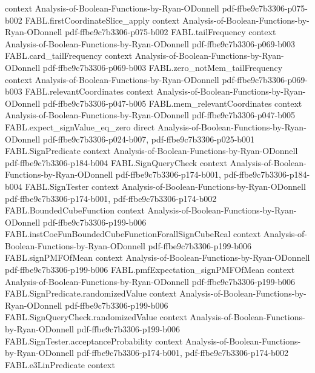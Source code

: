 \begin{theorem}
  {context}
  {Analysis-of-Boolean-Functions-by-Ryan-ODonnell}
  {pdf-ffbe9c7b3306-p075-b002}
\proofstep
  {FABL.firstCoordinateSlice_apply}
  {context}
  {Analysis-of-Boolean-Functions-by-Ryan-ODonnell}
  {pdf-ffbe9c7b3306-p075-b002}
\proofstep
  {FABL.tailFrequency}
  {context}
  {Analysis-of-Boolean-Functions-by-Ryan-ODonnell}
  {pdf-ffbe9c7b3306-p069-b003}
\proofstep
  {FABL.card_tailFrequency}
  {context}
  {Analysis-of-Boolean-Functions-by-Ryan-ODonnell}
  {pdf-ffbe9c7b3306-p069-b003}
\proofstep
  {FABL.zero_notMem_tailFrequency}
  {context}
  {Analysis-of-Boolean-Functions-by-Ryan-ODonnell}
  {pdf-ffbe9c7b3306-p069-b003}
\proofstep
  {FABL.relevantCoordinates}
  {context}
  {Analysis-of-Boolean-Functions-by-Ryan-ODonnell}
  {pdf-ffbe9c7b3306-p047-b005}
\proofstep
  {FABL.mem_relevantCoordinates}
  {context}
  {Analysis-of-Boolean-Functions-by-Ryan-ODonnell}
  {pdf-ffbe9c7b3306-p047-b005}
\proofstep
  {FABL.expect_signValue_eq_zero}
  {direct}
  {Analysis-of-Boolean-Functions-by-Ryan-ODonnell}
  {pdf-ffbe9c7b3306-p024-b007,
    pdf-ffbe9c7b3306-p025-b001}
\proofstep
  {FABL.SignPredicate}
  {context}
  {Analysis-of-Boolean-Functions-by-Ryan-ODonnell}
  {pdf-ffbe9c7b3306-p184-b004}
\proofstep
  {FABL.SignQueryCheck}
  {context}
  {Analysis-of-Boolean-Functions-by-Ryan-ODonnell}
  {pdf-ffbe9c7b3306-p174-b001,
    pdf-ffbe9c7b3306-p184-b004}
\proofstep
  {FABL.SignTester}
  {context}
  {Analysis-of-Boolean-Functions-by-Ryan-ODonnell}
  {pdf-ffbe9c7b3306-p174-b001,
    pdf-ffbe9c7b3306-p174-b002}
\proofstep
  {FABL.BoundedCubeFunction}
  {context}
  {Analysis-of-Boolean-Functions-by-Ryan-ODonnell}
  {pdf-ffbe9c7b3306-p199-b006}
\proofstep
  {FABL.instCoeFunBoundedCubeFunctionForallSignCubeReal}
  {context}
  {Analysis-of-Boolean-Functions-by-Ryan-ODonnell}
  {pdf-ffbe9c7b3306-p199-b006}
\proofstep
  {FABL.signPMFOfMean}
  {context}
  {Analysis-of-Boolean-Functions-by-Ryan-ODonnell}
  {pdf-ffbe9c7b3306-p199-b006}
\proofstep
  {FABL.pmfExpectation_signPMFOfMean}
  {context}
  {Analysis-of-Boolean-Functions-by-Ryan-ODonnell}
  {pdf-ffbe9c7b3306-p199-b006}
\proofstep
  {FABL.SignPredicate.randomizedValue}
  {context}
  {Analysis-of-Boolean-Functions-by-Ryan-ODonnell}
  {pdf-ffbe9c7b3306-p199-b006}
\proofstep
  {FABL.SignQueryCheck.randomizedValue}
  {context}
  {Analysis-of-Boolean-Functions-by-Ryan-ODonnell}
  {pdf-ffbe9c7b3306-p199-b006}
\proofstep
  {FABL.SignTester.acceptanceProbability}
  {context}
  {Analysis-of-Boolean-Functions-by-Ryan-ODonnell}
  {pdf-ffbe9c7b3306-p174-b001,
    pdf-ffbe9c7b3306-p174-b002}
\proofstep
  {FABL.e3LinPredicate}
  {context}

\end{theorem}
